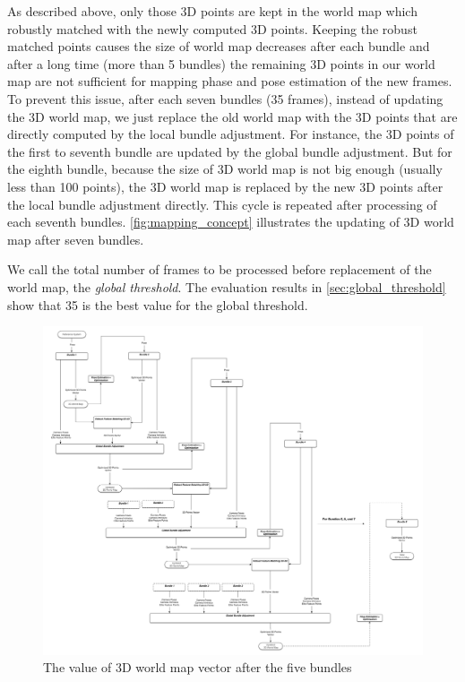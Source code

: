 As described above, only those 3D points are kept in the world map which robustly matched with the newly computed 3D points. Keeping the robust matched points causes the size of world map decreases after each bundle and after a long time (more than 5 bundles) the remaining 3D points in our world map are not sufficient for mapping phase and pose estimation of the new frames. To prevent this issue, after each seven bundles (35 frames), instead of updating the 3D world map, we just replace the old world map with the 3D points that are directly computed by the local bundle adjustment. For instance, the 3D points of the first to seventh bundle are updated by the global bundle adjustment. But for the eighth bundle, because the size of 3D world map is not big enough (usually less than 100 points), the 3D world map is replaced by the new 3D points after the local bundle adjustment directly. This cycle is repeated after processing of each seventh bundles. \autoref{fig:mapping_concept} illustrates the updating of 3D world map after seven bundles. 

We call the total number of frames to be processed before replacement of the world map, the \textit{global threshold}. The evaluation results in \autoref{sec:global_threshold} show that 35 is the best value for the global threshold.

\begin{figure}[H]
  \centering
  \includegraphics[width=150mm]{figures/mapping}
  \caption{The value of 3D world map vector after the five bundles}\label{fig:mapping_concept}
\end{figure}

